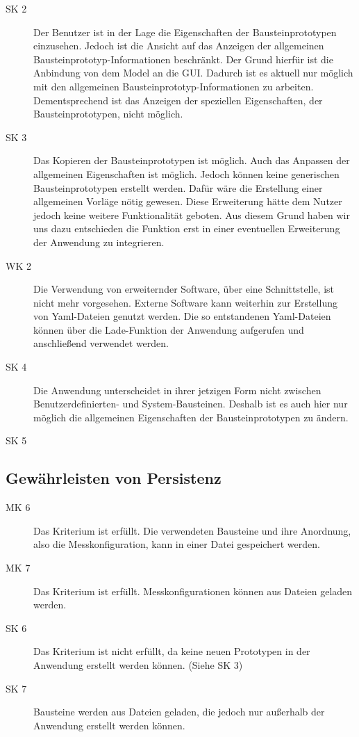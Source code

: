 \documentclass[parskip=full]{scrartcl}
\begin{document}
\begin{description}
	\item[SK 2] Der Benutzer ist in der Lage die Eigenschaften der Bausteinprototypen einzusehen. Jedoch ist die Ansicht auf das Anzeigen der \gls{allgemeinen Bausteinprototyp-Informationen} beschränkt. Der Grund hierfür ist die Anbindung von dem Model an die GUI. Dadurch ist es aktuell nur möglich mit den allgemeinen Bausteinprototyp-Informationen zu arbeiten. Dementsprechend ist das Anzeigen der speziellen Eigenschaften, der Bausteinprototypen, nicht möglich.
	\item[SK 3] Das Kopieren der Bausteinprototypen ist möglich. Auch das Anpassen der allgemeinen Eigenschaften ist möglich. Jedoch können keine generischen Bausteinprototypen erstellt werden. Dafür wäre die Erstellung einer allgemeinen Vorläge nötig gewesen. Diese Erweiterung hätte dem Nutzer jedoch keine weitere Funktionalität geboten. Aus diesem Grund haben wir uns dazu entschieden die Funktion erst in einer eventuellen Erweiterung der Anwendung zu integrieren.
	\item[WK 2] Die Verwendung von erweiternder Software, über eine Schnittstelle, ist nicht mehr vorgesehen. Externe Software kann weiterhin zur Erstellung von Yaml-Dateien genutzt werden. Die so entstandenen Yaml-Dateien können über die Lade-Funktion der Anwendung aufgerufen und anschließend verwendet werden.
	\item[SK 4] Die Anwendung unterscheidet in ihrer jetzigen Form nicht zwischen Benutzerdefinierten- und System-Bausteinen. Deshalb ist es auch hier nur möglich die allgemeinen Eigenschaften der Bausteinprototypen zu ändern.
	\item[SK 5]
\end{description}
		
\subsection{Gewährleisten von Persistenz}

\begin{description}
\item[MK 6] Das Kriterium ist erfüllt. Die verwendeten Bausteine und ihre Anordnung, also die Messkonfiguration, kann in einer Datei gespeichert werden.
\item[MK 7] Das Kriterium ist erfüllt. Messkonfigurationen können aus Dateien geladen werden.
\item[SK 6] Das Kriterium ist nicht erfüllt, da keine neuen Prototypen in der Anwendung erstellt werden können. (Siehe SK 3)
\item[SK 7] Bausteine werden aus Dateien geladen, die jedoch nur außerhalb der Anwendung erstellt werden können.
\end{description}
\end{document}
